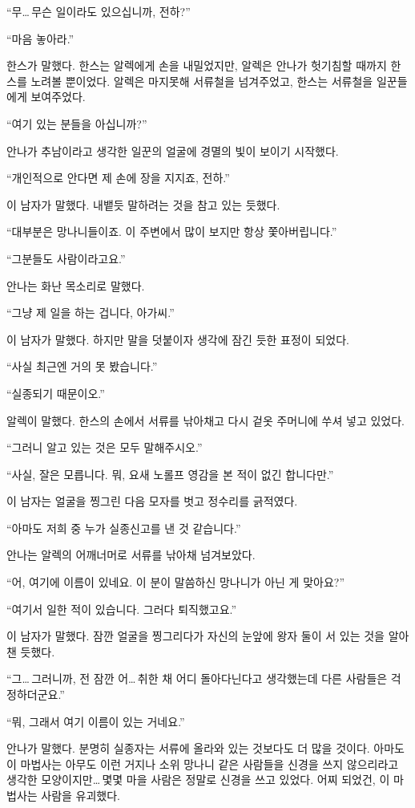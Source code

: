 ``무\ldots\,무슨 일이라도 있으십니까, 전하?''

``마음 놓아라.''

한스가 말했다. 한스는 알렉에게 손을 내밀었지만, 알렉은 안나가 헛기침할 때까지 한스를 노려볼 뿐이었다. 알렉은 마지못해 서류철을 넘겨주었고, 한스는 서류철을 일꾼들에게 보여주었다.

``여기 있는 분들을 아십니까?''

안나가 추남이라고 생각한 일꾼의 얼굴에 경멸의 빛이 보이기 시작했다.

``개인적으로 안다면 제 손에 장을 지지죠, 전하.''

이 남자가 말했다. 내뱉듯 말하려는 것을 참고 있는 듯했다.

``대부분은 망나니들이죠. 이 주변에서 많이 보지만 항상 쫓아버립니다.''

``그분들도 사람이라고요.''

안나는 화난 목소리로 말했다.

``그냥 제 일을 하는 겁니다, 아가씨.''

이 남자가 말했다. 하지만 말을 덧붙이자 생각에 잠긴 듯한 표정이 되었다.

``사실 최근엔 거의 못 봤습니다.''

``실종되기 때문이오.''

알렉이 말했다. 한스의 손에서 서류를 낚아채고 다시 겉옷 주머니에 쑤셔 넣고 있었다.

``그러니 알고 있는 것은 모두 말해주시오.''

``사실, 잘은 모릅니다. 뭐, 요새 노롤프 영감을 본 적이 없긴 합니다만.''

이 남자는 얼굴을 찡그린 다음 모자를 벗고 정수리를 긁적였다.

``아마도 저희 중 누가 실종신고를 낸 것 같습니다.''

안나는 알렉의 어깨너머로 서류를 낚아채 넘겨보았다.

``어, 여기에 이름이 있네요. 이 분이 말씀하신 망나니가 아닌 게 맞아요?''

``여기서 일한 적이 있습니다. 그러다 퇴직했고요.''

이 남자가 말했다. 잠깐 얼굴을 찡그리다가 자신의 눈앞에 왕자 둘이 서 있는 것을 알아챈 듯했다.

``그\ldots\,그러니까, 전 잠깐 어\ldots\,취한 채 어디 돌아다닌다고 생각했는데 다른 사람들은 걱정하더군요.''

``뭐, 그래서 여기 이름이 있는 거네요.''

안나가 말했다. 분명히 실종자는 서류에 올라와 있는 것보다도 더 많을 것이다. 아마도 이 마법사는 아무도 이런 거지나 소위 망나니 같은 사람들을 신경을 쓰지 않으리라고 생각한 모양이지만\ldots\,몇몇 마을 사람은 정말로 신경을 쓰고 있었다. 어찌 되었건, 이 마법사는 사람을 유괴했다.

